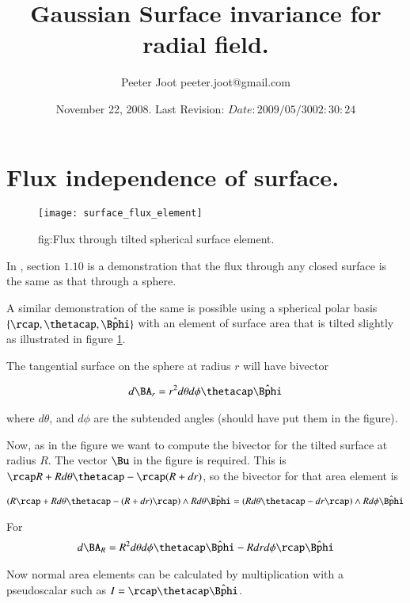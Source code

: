\documentclass{article}
\title{ Gaussian Surface invariance for radial field. }
\author{Peeter Joot \quad peeter.joot@gmail.com}
\date{ November 22, 2008.  Last Revision: $Date: 2009/05/30 02:30:24 $ }
\newcommand{\phicap}[0]{\hat{\Bphi}}
\begin{document}
\maketitle{}
\section{ Flux independence of surface. }

\begin{figure}[htp]
\centering
\texttt{[image: surface\_flux\_element]}
\caption{fig:Flux through tilted spherical surface element.}
\label{fig:surface_flux_element}
\end{figure}

In \cite{purcell1963eam}, section $1.10$ is a demonstration that the flux
through any closed surface is the same as that through a sphere.

A similar demonstration of the same is possible using a spherical polar basis
$\{\rcap, \thetacap, \phicap\}$ with an element of surface area that is
tilted slightly as illustrated in figure \ref{fig:surface_flux_element}.

The tangential surface on the sphere at radius $r$ will have bivector

\begin{align}
d\BA_r = r^2 d\theta d\phi \thetacap\phicap
\end{align}

where $d\theta$, and $d\phi$ are the subtended angles (should have put them in the figure).

Now, as in the figure we want to compute the bivector for the tilted surface at radius $R$.  The vector $\Bu$ in the figure is required.
This is $\rcap R + R d\theta \thetacap - \rcap(R + dr)$, so the bivector for that area element is

\begin{align*}
\left(R \rcap + R d\theta \thetacap - (R + dr) \rcap \right) \wedge {R d\theta \phicap} 
&= \left(R d\theta \thetacap - dr \rcap \right) \wedge {R d\phi \phicap} \\
\end{align*}

For
\begin{align}
d\BA_R = R^2 d\theta d\phi \thetacap \phicap - R dr d\phi \rcap \phicap
\end{align}

Now normal area elements can be calculated by multiplication with a  pseudoscalar such as $I = \rcap \thetacap \phicap$.
\end{document}

